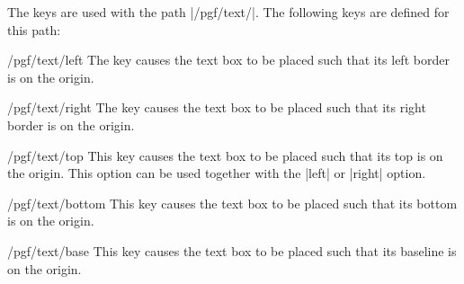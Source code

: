 \begin{command}{\pgftext{}}
    The  keys are used with the path |/pgf/text/|. The following
    keys are defined for this path:
    \begin{key}{/pgf/text/left}
        The key causes the text box to be placed such that its left border is
        on the origin.
\begin{codeexample}[]
\end{codeexample}
    \end{key}
    \begin{key}{/pgf/text/right}
        The key causes the text box to be placed such that its right border is
        on the origin.
\begin{codeexample}[]
\end{codeexample}
    \end{key}
    \begin{key}{/pgf/text/top}
        This key causes the text box to be placed such that its top is on the
        origin. This option can be used together with the |left| or |right|
        option.
\begin{codeexample}[]
\end{codeexample}
\begin{codeexample}[]
\end{codeexample}
    \end{key}
    \begin{key}{/pgf/text/bottom}
        This key causes the text box to be placed such that its bottom is on
        the origin.
\begin{codeexample}[]
\end{codeexample}
\begin{codeexample}[]
\end{codeexample}
    \end{key}
    \begin{key}{/pgf/text/base}
        This key causes the text box to be placed such that its baseline is on
        the origin.
\begin{codeexample}[]

\end{codeexample}
\end{key}
\end{command}
